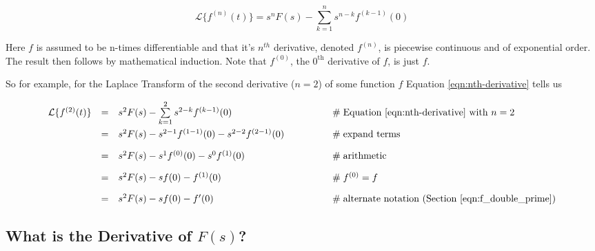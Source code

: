 \documentclass{article}
\theoremstyle{definition}
\begin{document}
\bigskip
\begin{equation}
\mathcal{L}\{f^{(n)}(t)\} =  s^{n}F(s)- \sum_{k=1}^n s^{n-k} f^{(k-1)}(0)
\label{eqn:nth-derivative}
\end{equation}

\bigskip  
\noindent
Here $f$ is assumed to be n-times differentiable and that it's $n^{th}$ derivative, denoted $f^{(n)}$, is piecewise continuous and of exponential order. The 
result then follows by mathematical induction. Note that $f^{(0)}$, the $0^{\text{th}}$ derivative of $f$, is just $f$.

\bigskip
\noindent
So for example, for the Laplace Transform of the second derivative ($n = 2$) of some function $f$ Equation \ref{eqn:nth-derivative} tells us

\begin{equation*}
\begin{array}{lllll}
\mathcal{L}\{f^{(2)}(t)\}  
&=&  s^{2}F(s)- \sum\limits_{k=1}^2 s^{2-k} f^{(k-1)}(0)                                         &\qquad \qquad \mathrel{\#} \text{Equation \ref{eqn:nth-derivative} with $n = 2$}               \\
[10pt]
&=&  s^{2}F(s)- s^{2-1}f^{(1-1)}(0)  - s^{2-2}f^{(2-1)}(0)                                         &\qquad \qquad \mathrel{\#} \text{expand terms}                                                                  \\
[10pt]
&=&  s^{2}F(s)- s^{1}f^{(0)}(0)  - s^0f^{(1)}(0)                                                        &\qquad \qquad \mathrel{\#} \text{arithmetic}                                                                        \\
[10pt]
&=&  s^{2}F(s)- sf(0)  - f^{(1)}(0)                                                                            &\qquad \qquad \mathrel{\#} f^{(0)} = f                                                                                  \\
[10pt]
&=& s^{2}F(s)- sf(0)  - f^{\prime}(0)                                                                       &\qquad \qquad \mathrel{\#} \text{alternate notation (Section \ref{eqn:f_double_prime})}
\end{array}
\end{equation*}


\subsection{What is the Derivative of $F(s)$?}
\end{document}
